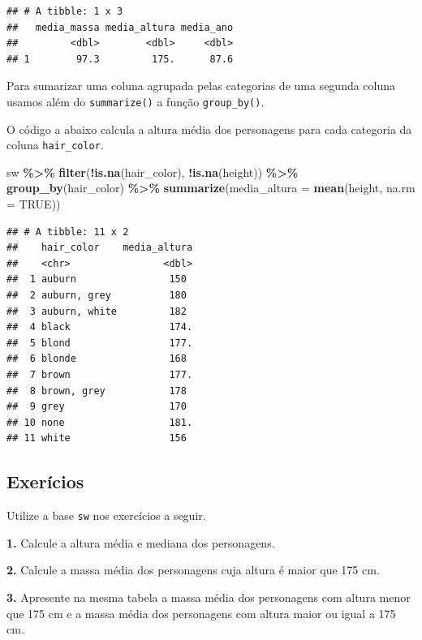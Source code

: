 \documentclass[
]{book}
\newenvironment{Shaded}{\begin{snugshade}}{\end{snugshade}}
\newcommand{\AttributeTok}[1]{\textcolor[rgb]{0.13,0.29,0.53}{#1}}
\newcommand{\ConstantTok}[1]{\textcolor[rgb]{0.56,0.35,0.01}{#1}}
\newcommand{\FunctionTok}[1]{\textcolor[rgb]{0.13,0.29,0.53}{\textbf{#1}}}
\newcommand{\NormalTok}[1]{#1}
\newcommand{\SpecialCharTok}[1]{\textcolor[rgb]{0.81,0.36,0.00}{\textbf{#1}}}
\begin{document}
\begin{verbatim}
## # A tibble: 1 x 3
##   media_massa media_altura media_ano
##         <dbl>        <dbl>     <dbl>
## 1        97.3         175.      87.6
\end{verbatim}

Para sumarizar uma coluna agrupada pelas categorias de uma segunda
coluna usamos além do \texttt{summarize()} a função \texttt{group\_by()}.

O código a abaixo calcula a altura média dos personagens para cada
categoria da coluna \texttt{hair\_color}.

\begin{Shaded}
\begin{Highlighting}[]
\NormalTok{sw }\SpecialCharTok{\%\textgreater{}\%} 
  \FunctionTok{filter}\NormalTok{(}\SpecialCharTok{!}\FunctionTok{is.na}\NormalTok{(hair\_color), }\SpecialCharTok{!}\FunctionTok{is.na}\NormalTok{(height)) }\SpecialCharTok{\%\textgreater{}\%} 
  \FunctionTok{group\_by}\NormalTok{(hair\_color) }\SpecialCharTok{\%\textgreater{}\%} 
  \FunctionTok{summarize}\NormalTok{(}\AttributeTok{media\_altura =} \FunctionTok{mean}\NormalTok{(height, }\AttributeTok{na.rm =} \ConstantTok{TRUE}\NormalTok{))}
\end{Highlighting}
\end{Shaded}

\begin{verbatim}
## # A tibble: 11 x 2
##    hair_color    media_altura
##    <chr>                <dbl>
##  1 auburn                150 
##  2 auburn, grey          180 
##  3 auburn, white         182 
##  4 black                 174.
##  5 blond                 177.
##  6 blonde                168 
##  7 brown                 177.
##  8 brown, grey           178 
##  9 grey                  170 
## 10 none                  181.
## 11 white                 156
\end{verbatim}

\subsection{Exerícios}\label{exeruxedcios}

Utilize a base \texttt{sw} nos exercícios a seguir.

\textbf{1.} Calcule a altura média e mediana dos personagens.

\textbf{2.} Calcule a massa média dos personagens cuja altura é maior que 175
cm.

\textbf{3.} Apresente na mesma tabela a massa média dos personagens com
altura menor que 175 cm e a massa média dos personagens com altura maior
ou igual a 175 cm.
\end{document}

